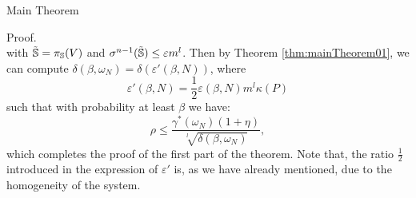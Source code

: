 \begin{subsection}{Main Theorem}
\begin{pf*}{Proof.}
\begin{equation*}
\end{equation*}
with $\tilde{\mathbb{S}} = \pi_{\mathbb{S}}(V)$ and $\sigma^{n-1}(\tilde{\mathbb{S}}) \leq \varepsilon m^l$. Then by Theorem \ref{thm:mainTheorem01}, we can compute $\delta(\beta, \omega_N) =\delta(\varepsilon'(\beta,N))$, where
\begin{equation}\label{eqn:eps2}
\varepsilon'(\beta, N) = \frac{1}{2} \varepsilon(\beta,N) m^l \kappa(P) 
\end{equation} 
such that with probability at least $\beta$ we have: $$\rho \leq \frac{\gamma^{*}(\omega_N) (1 + \eta)}{\sqrt[l]{\delta(\beta, \omega_N)}},$$ which completes the proof of the first part of the theorem. Note that, the ratio $\frac{1}{2}$ introduced in the expression of $\varepsilon'$ is, as we have already mentioned, due to the homogeneity of the system.


%
%
%


\end{pf*}
\end{subsection}
